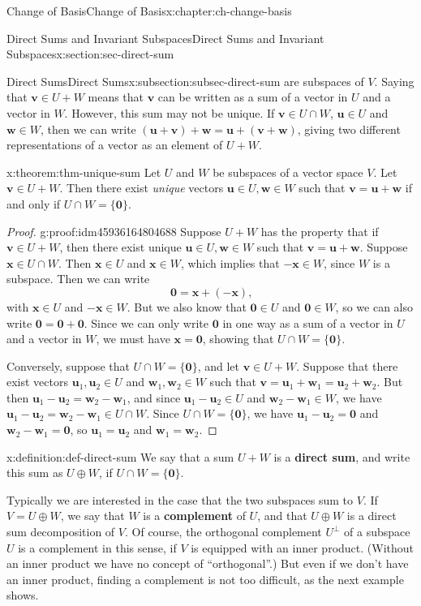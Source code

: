 \documentclass[oneside,10pt,]{book}
\newcommand{\terminology}[1]{\textbf{#1}}
\numberwithin{equation}{section}
\newcommand{\uu}{\mathbf{u}}
\newcommand{\vv}{\mathbf{v}}
\newcommand{\ww}{\mathbf{w}}
\newcommand{\xx}{\mathbf{x}}
\newcommand{\zer}{\mathbf{0}}
\begin{document}
\begin{chapterptx}{Change of Basis}{}{Change of Basis}{}{}{x:chapter:ch-change-basis}
\begin{sectionptx}{Direct Sums and Invariant Subspaces}{}{Direct Sums and Invariant Subspaces}{}{}{x:section:sec-direct-sum}
\begin{subsectionptx}{Direct Sums}{}{Direct Sums}{}{}{x:subsection:subsec-direct-sum}
are subspaces of \(V\). Saying that \(\vv\in U+W\) means that \(\vv\) can be written as a sum of a vector in \(U\) and a vector in \(W\). However, this sum may not be unique. If \(\vv\in U\cap W\), \(\uu\in U\) and \(\ww\in W\), then we can write \((\uu+\vv)+\ww = \uu + (\vv+\ww)\), giving two different representations of a vector as an element of \(U+W\).%
\begin{theorem}{}{}{x:theorem:thm-unique-sum}%
Let \(U\) and \(W\) be subspaces of a vector space \(V\). Let \(\vv\in U+W\). Then there exist \emph{unique} vectors \(\uu\in U, \ww\in W\) such that \(\vv = \uu+\ww\) if and only if \(U\cap W = \{\mathbf{0}\}\).%
\end{theorem}
\begin{proof}{}{g:proof:idm45936164804688}
Suppose \(U+W\) has the property that if \(\vv\in U+W\), then there exist unique \(\uu\in U,\ww\in W\) such that \(\vv=\uu+\ww\). Suppose \(\mathbf{x}\in U\cap W\). Then \(\xx\in U\) and \(\xx\in W\), which implies that \(-\xx\in W\), since \(W\) is a subspace. Then we can write%
\begin{equation*}
\mathbf{0} = \xx + (-\xx)\text{,}
\end{equation*}
with \(\xx\in U\) and \(-\xx\in W\). But we also know that \(\mathbf{0}\in U\) and \(\mathbf{0}\in W\), so we can also write \(\mathbf{0}=\mathbf{0}+\mathbf{0}\). Since we can only write \(\mathbf{0}\) in one way as a sum of a vector in \(U\) and a vector in \(W\), we must have \(\xx=\mathbf{0}\), showing that \(U\cap W = \{\mathbf{0}\}\).%
\par
Conversely, suppose that \(U\cap W = \{\zer\}\), and let \(\vv\in U+W\). Suppose that there exist vectors \(\uu_1,\uu_2\in U\) and \(\ww_1,\ww_2\in W\) such that \(\vv = \uu_1+\ww_1=\uu_2+\ww_2\). But then \(\uu_1-\uu_2=\ww_2-\ww_1\), and since \(\uu_1-\uu_2\in U\) and \(\ww_2-\ww_1\in W\), we have \(\uu_1-\uu_2=\ww_2-\ww_1\in U\cap W\). Since \(U\cap W=\{\zer\}\), we have \(\uu_1-\uu_2=\zer\) and \(\ww_2-\ww_1=\zer\), so \(\uu_1=\uu_2\) and \(\ww_1=\ww_2\).%
\end{proof}
\begin{definition}{}{x:definition:def-direct-sum}%
We say that a sum \(U+W\) is a \terminology{direct sum}, and write this sum as \(U\oplus W\), if \(U\cap W = \{\mathbf{0}\}\).%
\end{definition}
Typically we are interested in the case that the two subspaces sum to \(V\). If \(V = U\oplus W\), we say that \(W\) is a \terminology{complement} of \(U\), and that \(U\oplus W\) is a direct sum decomposition of \(V\). Of course, the orthogonal complement \(U^\bot\) of a subspace \(U\) is a complement in this sense, if \(V\) is equipped with an inner product. (Without an inner product we have no concept of ``orthogonal''.) But even if we don't have an inner product, finding a complement is not too difficult, as the next example shows.%

\end{subsectionptx}
\end{sectionptx}
\end{chapterptx}
\end{document}
